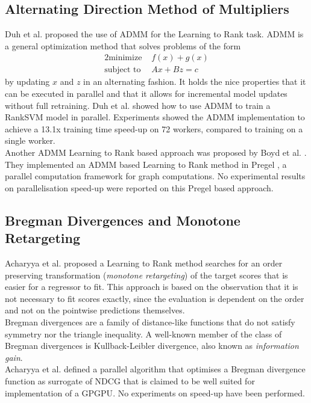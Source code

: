 \subsection{Alternating Direction Method of Multipliers}
Duh et al. \cite{Duh2011} proposed the use of \ac{ADMM} for the Learning to Rank task. \ac{ADMM} is a general optimization method that solves problems of the form
\begin{alignat*}{2}
\text{minimize }   &  f(x) + g(x) \\
\text{subject to } &  Ax + Bz = c
\end{alignat*}
by updating $x$ and $z$ in an alternating fashion. It holds the nice properties that it can be executed in parallel and that it allows for incremental model updates without full retraining. Duh et al. \cite{Duh2011} showed how to use \ac{ADMM} to train a Rank\ac{SVM} \cite{Herbrich1999, Joachims2002} model in parallel. Experiments showed the \ac{ADMM} implementation to achieve a 13.1x training time speed-up on 72 workers, compared to training on a single worker.\\

Another \ac{ADMM} Learning to Rank based approach was proposed by Boyd et al. \cite{Boyd2012}. They implemented an \ac{ADMM} based Learning to Rank method in Pregel \cite{Malewicz2010}, a parallel computation framework for graph computations. No experimental results on parallelisation speed-up were reported on this Pregel based approach.
\subsection{Bregman Divergences and Monotone Retargeting}
Acharyya et al. \cite{Acharyya2012, Acharyya2013} proposed a Learning to Rank method searches for an order preserving transformation (\emph{monotone retargeting}) of the target scores that is easier for a regressor to fit. This approach is based on the observation that it is not necessary to fit scores exactly, since the evaluation is dependent on the order and not on the pointwise predictions themselves.\\

Bregman divergences are a family of distance-like functions that do not satisfy symmetry nor the triangle inequality. A well-known member of the class of Bregman divergences is Kullback-Leibler divergence, also known as \emph{information gain}.\\

Acharyya et al. \cite{Acharyya2012, Acharyya2013} defined a parallel algorithm that optimises a Bregman divergence function as surrogate of \ac{NDCG} that is claimed to be well suited for implementation of a \ac{GPGPU}. No experiments on speed-up have been performed.
